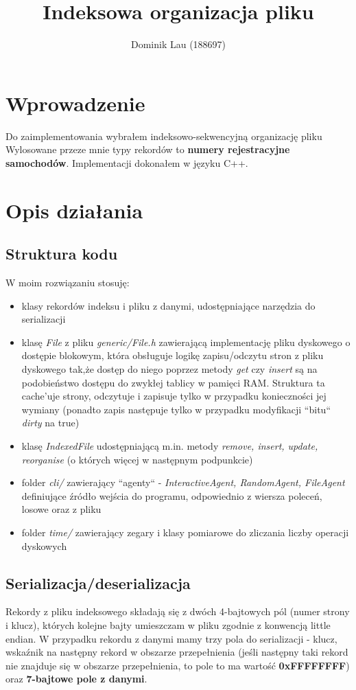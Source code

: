 \documentclass{article}
\title{Indeksowa organizacja pliku}
\author{Dominik Lau (188697)}
\begin{document}
\maketitle

\section{Wprowadzenie}
Do zaimplementowania wybrałem indeksowo-sekwencyjną organizację pliku 
Wylosowane przeze mnie typy rekordów to \textbf{numery rejestracyjne samochodów}. Implementacji
dokonałem w języku C++.
\section{Opis działania}
\subsection{Struktura kodu}
W moim rozwiązaniu stosuję:
\begin{itemize}
\item klasy rekordów indeksu i pliku z danymi, udostępniające narzędzia do serializacji
\item klasę \textit{File} z pliku \textit{generic/File.h} zawierającą implementację
pliku dyskowego o dostępie blokowym,  która obsługuje logikę zapisu/odczytu stron z pliku dyskowego tak,że
dostęp do niego poprzez metody \textit{get} czy \textit{insert} są na podobieństwo dostępu do zwykłej tablicy w pamięci RAM. Struktura ta cache'uje strony, odczytuje i zapisuje tylko w przypadku konieczności jej wymiany (ponadto zapis następuje tylko w przypadku modyfikacji ``bitu`` \textit{dirty} na true)
 \item klasę \textit{IndexedFile} udostępniającą m.in. metody \textit{remove, insert, update, reorganise} (o których więcej w następnym podpunkcie)
 \item folder \textit{cli/} zawierający ``agenty`` - \textit{InteractiveAgent, RandomAgent, FileAgent} definiujące źródło wejścia do programu, odpowiednio z wiersza poleceń, losowe oraz z pliku
\item folder \textit{time/} zawierający zegary i klasy pomiarowe do zliczania liczby operacji dyskowych
\end{itemize}
\subsection{Serializacja/deserializacja}
Rekordy z pliku indeksowego składają się z dwóch 4-bajtowych pól (numer strony i klucz), których kolejne bajty umieszczam w pliku zgodnie z konwencją little endian. W przypadku rekordu z danymi mamy trzy pola do serializacji - klucz, wskaźnik na następny rekord w obszarze przepełnienia (jeśli następny taki rekord nie znajduje
się w obszarze przepełnienia, to pole to ma wartość \textbf{0xFFFFFFFF}) oraz \textbf{7-bajtowe pole z danymi}. 
\end{document}
